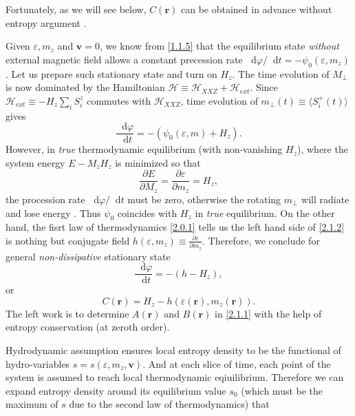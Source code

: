 \documentclass[10pt,nofootinbib]{revtex4}
\newcommand*\dd{\mathop{}\!\mathrm{d}}
\begin{document}
			Fortunately, as we will see below, $C(\bm{r})$ can be obtained in advance without entropy argument \cite{chaikin2000principles,halperin1969hydrodynamic}.\par
			Given $\varepsilon,m_z$ and $\bm{v}=0$, we know from \eqref{1.1.5} that the equilibrium state \emph{without} external magnetic field allows a constant precession rate $\dd\varphi/\dd t=-\psi_0(\varepsilon,m_z)$. Let us prepare such stationary state and turn on $H_z$. The time evolution of $M_\perp$ is now dominated by the Hamiltonian $\mathcal{H}\equiv\mathcal{H}_{XXZ}+\mathcal{H}_{ext}$. Since $\mathcal{H}_{ext}\equiv-H_z\sum_i S_i^z$ commutes with $\mathcal{H}_{XXZ}$, time evolution of $m_\perp(t)\equiv\langle S_i^+(t)\rangle$ gives
			\begin{equation*}
				\dfrac{\dd\varphi}{\dd t}=-(\psi_0(\varepsilon,m)+H_z).
			\end{equation*}
			However, in \emph{true} thermodynamic equilibrium (with non-vanishing $H_z$), where the system energy $E-M_z H_z$ is minimized so that
			\begin{equation}\label{2.1.2}
				\dfrac{\partial E}{\partial M_z}=\dfrac{\partial \varepsilon}{\partial m_z}=H_z,
			\end{equation}
			the procession rate $\dd\varphi/\dd t$ must be zero, otherwise the rotating $m_\perp$ will radiate and lose energy \cite{halperin1969hydrodynamic}. Thus $\psi_0$ coincides with $H_z$ in \emph{true} equilibrium. On the other hand, the fisrt law of thermodynamics \eqref{2.0.1} tells us the left hand side of \eqref{2.1.2} is nothing but conjugate field $h(\varepsilon,m_z)\equiv\frac{\partial \varepsilon}{\partial m_z}$. Therefore, we conclude for general \emph{non-dissipative} stationary state 
			\begin{equation}\label{2.1.3}
				\dfrac{\dd\varphi}{\dd t}=-(h-H_z),
			\end{equation}
			or
			\begin{equation}\label{2.1.4}
				C(\bm{r})=H_z-h(\varepsilon(\bm{r}),m_z(\bm{r})).
			\end{equation}
			\indent The left work is to determine $A(\bm{r})$ and $B(\bm{r})$ in \eqref{2.1.1} with the help of entropy conservation (at zeroth order).\par
			Hydrodynamic assumption ensures local entropy density to be the functional of hydro-variables $s=s(\varepsilon,m_z,\bm{v})$. And at each slice of time, each point of the system is assumed to reach local thermodynamic eqiuilibrium. Therefore we can expand entropy density around its equilibrium value $s_0$ (which must be the maximum of $s$ due to the second law of thermodynamics) that 
\end{document}
